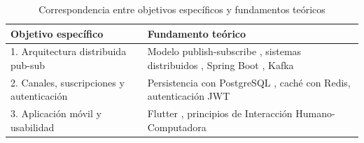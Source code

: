 \begin{table}[H]
\centering
\small
\begin{tabular}{|p{8cm}|p{8cm}|}
\hline
\textbf{Objetivo específico} & \textbf{Fundamento teórico} \\
\hline
1. Arquitectura distribuida pub-sub & Modelo publish-subscribe \cite{tarkoma2012publish}, sistemas distribuidos \cite{tanenbaum2023distributed}, Spring Boot \cite{spring2023boot}, Kafka \cite{kafka2017streaming} \\
\hline
2. Canales, suscripciones y autenticación & Persistencia con PostgreSQL \cite{postgresql2024docs}, caché con Redis, autenticación JWT \cite{jwt2015rfc} \\
\hline
3. Aplicación móvil y usabilidad & Flutter \cite{flutter2024docs}, principios de Interacción Humano-Computadora \cite{amexcomp2020ihc} \\
\hline
\end{tabular}
\caption{Correspondencia entre objetivos específicos y fundamentos teóricos}
\label{tab:objetivos_marco}
\end{table}

